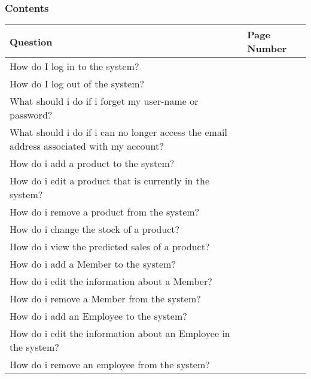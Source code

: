 \pagebreak
\subsubsection{Contents}

\begin{center}
    \begin{longtable}{|p{8cm}|p{3cm}|}
        \hline
	 \textbf{Question} & \textbf{Page Number} \\ \hline
	How do I log in to the system? & \pageref{fig:Logging into the system} \\ \hline
	How do I log out of the system? & \pageref{fig:Logging out of the system} \\ \hline
	What should i do if i forget my user-name or password?&  \pageref{fig:Forgetting Your User-name or Password} \\ \hline
	What should i do if i can no longer access the email address associated with my account? &  \pageref{fig:Unable to access your email address} \\ \hline
	How do i add a product to the system? &  \pageref{fig:Adding a Product to the system} \\ \hline
	How do i edit a product that is currently in the system?&  \pageref{fig:Editing a Product in the system} \\ \hline
	How do i remove a product from the system?&  \pageref{fig:Removing a Product from the system} \\ \hline
	How do i change the stock of a product?&  \pageref{fig:Changing the stock of a Product} \\ \hline
	How do i view the predicted sales of a product?&  \pageref{fig:Product Stock Prediction} \\ \hline
	How do i add a Member to the system?&  \pageref{fig:Adding a Member to the system} \\ \hline
	How do i edit the information about a Member?&  \pageref{fig:Editing a Member currently in the system} \\ \hline
	How do i remove a Member from the system?&  \pageref{fig:Removing a Member from the system} \\ \hline
	How do i add an Employee to the system?&  \pageref{fig:Adding an Employee to the system} \\ \hline
	How do i edit the information about an Employee in the system?&  \pageref{fig:Editing an Employee in the system} \\ \hline
	How do i remove an employee from the system?&  \pageref{fig:Removing an Employee for the system.} \\ \hline

\end{longtable}
\end{center}
